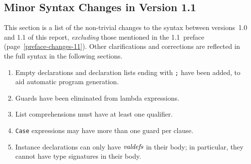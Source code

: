 \subsection{Minor Syntax Changes in Version 1.1}
\label{syntax-changes}

This section is a list of the non-trivial changes to the \Haskell{}
syntax between versions~1.0 and 1.1 of this report, {\em excluding} those
mentioned in the 1.1~preface (page~\ref{preface-changes-11}).  Other
clarifications and corrections are reflected in the full syntax in the
following sections.

\begin{enumerate}
\item
Empty declarations and declaration lists ending with \mbox{\tt ;} have been
added, to aid automatic program generation.

\item
Guards have been eliminated from lambda expressions. 

\item
List comprehensions must have at least one qualifier. 

\item
\mbox{\tt Case} expressions may have more than one guard per clause.

\item
Instance declarations can only have \mbox{$\it valdefs$}
in their body; in particular, they cannot have type signatures in
their body.
\end{enumerate}

